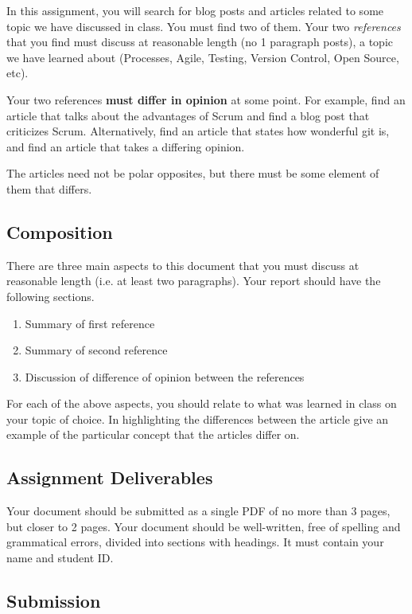 \documentclass[letterpaper]{article}
\begin{document}
In this assignment, you will search for blog posts and articles related to some topic we have discussed in class.  You must find two of them.  Your two \emph{references} that you find must discuss at reasonable length (no 1 paragraph posts), a topic we have learned about (Processes, Agile, Testing, Version Control, Open Source, etc).

Your two references \textbf{must differ in opinion} at some point.  For example, find an article that talks about the advantages of Scrum and find a blog post that criticizes Scrum.  Alternatively, find an article that states how wonderful git is, and find an article that takes a differing opinion.

The articles need not be polar opposites, but there must be some element of them that differs.

\subsection*{Composition}

There are three main aspects to this document that you must discuss at reasonable length (i.e. at least two paragraphs).  Your report should have the following sections.

\begin{enumerate}
\item Summary of first reference
\item Summary of second reference
\item Discussion of difference of opinion between the references	
\end{enumerate}

For each of the above aspects, you should relate to what was learned in class on your topic of choice.
In highlighting the differences between the article give an example of the particular concept that the articles differ on.

\subsection*{Assignment Deliverables}

Your document should be submitted as a single PDF of no more than 3 pages, but closer to 2 pages.  
Your document should be well-written, free of spelling and grammatical errors,
divided into sections with headings.  It must contain your name and student ID.

\subsection*{Submission}
\end{document}
